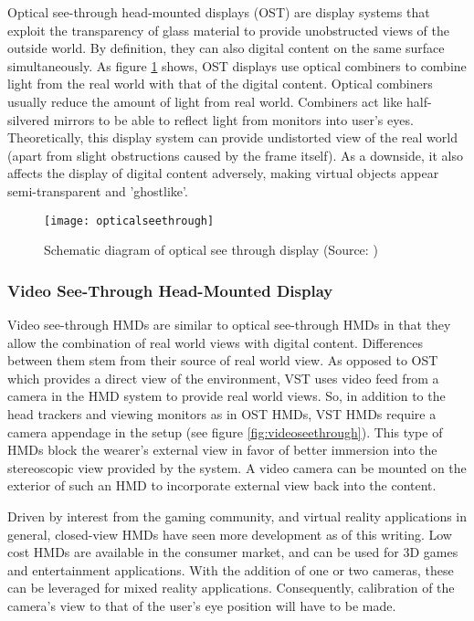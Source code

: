 Optical see-through head-mounted displays (OST) are display systems that exploit the transparency of glass material to provide unobstructed views of the outside world. By definition, they can also digital content on the same surface simultaneously. As figure \ref{fig:opticalseethrough} shows, OST displays use optical combiners to combine light from the real world with that of the digital content. Optical combiners usually reduce the amount of light from real world. Combiners act like half-silvered mirrors to be able to reflect light from monitors into user's eyes. Theoretically, this display system can provide undistorted view of the real world (apart from slight obstructions caused by the frame itself). As a downside, it also affects the display of digital content adversely, making virtual objects appear semi-transparent and 'ghostlike'.

\begin{figure}
	\centering
	\texttt{[image: opticalseethrough]}
	\caption{Schematic diagram of optical see through display (Source: \cite{azuma1997survey})}
	\label{fig:opticalseethrough}
\end{figure}

\subsubsection{Video See-Through Head-Mounted Display}
Video see-through HMDs are similar to optical see-through HMDs in that they allow the combination of real world views with digital content. Differences between them stem from their source of real world view. As opposed to OST which provides a direct view of the environment, VST uses video feed from a camera in the HMD system to provide real world views. So, in addition to the head trackers and viewing monitors as in OST HMDs, VST HMDs require a camera appendage in the setup (see figure \ref{fig:videoseethrough}). This type of HMDs block the wearer's external view in favor of better immersion into the stereoscopic view provided by the system. A video camera can be mounted on the exterior of such an HMD to incorporate external view back into the content.

Driven by interest from the gaming community, and virtual reality applications in general, closed-view HMDs have seen more development as of this writing. Low cost HMDs are available in the consumer market, and can be used for 3D games and entertainment applications. With the addition of one or two cameras, these can be leveraged for mixed reality applications. Consequently, calibration of the camera's view to that of the user's eye position will have to be made.

